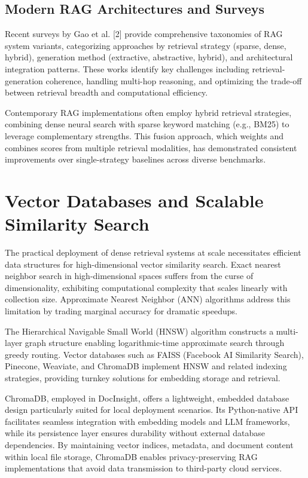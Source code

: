 \subsection{Modern RAG Architectures and Surveys}

Recent surveys by Gao et al. [2] provide comprehensive taxonomies of RAG system variants, categorizing approaches by retrieval strategy (sparse, dense, hybrid), generation method (extractive, abstractive, hybrid), and architectural integration patterns. These works identify key challenges including retrieval-generation coherence, handling multi-hop reasoning, and optimizing the trade-off between retrieval breadth and computational efficiency.

Contemporary RAG implementations often employ hybrid retrieval strategies, combining dense neural search with sparse keyword matching (e.g., BM25) to leverage complementary strengths. This fusion approach, which weights and combines scores from multiple retrieval modalities, has demonstrated consistent improvements over single-strategy baselines across diverse benchmarks.



\section{Vector Databases and Scalable Similarity Search}

The practical deployment of dense retrieval systems at scale necessitates efficient data structures for high-dimensional vector similarity search. Exact nearest neighbor search in high-dimensional spaces suffers from the curse of dimensionality, exhibiting computational complexity that scales linearly with collection size. Approximate Nearest Neighbor (ANN) algorithms address this limitation by trading marginal accuracy for dramatic speedups.

The Hierarchical Navigable Small World (HNSW) algorithm constructs a multi-layer graph structure enabling logarithmic-time approximate search through greedy routing. Vector databases such as FAISS (Facebook AI Similarity Search), Pinecone, Weaviate, and ChromaDB implement HNSW and related indexing strategies, providing turnkey solutions for embedding storage and retrieval.

ChromaDB, employed in DocInsight, offers a lightweight, embedded database design particularly suited for local deployment scenarios. Its Python-native API facilitates seamless integration with embedding models and LLM frameworks, while its persistence layer ensures durability without external database dependencies. By maintaining vector indices, metadata, and document content within local file storage, ChromaDB enables privacy-preserving RAG implementations that avoid data transmission to third-party cloud services.

